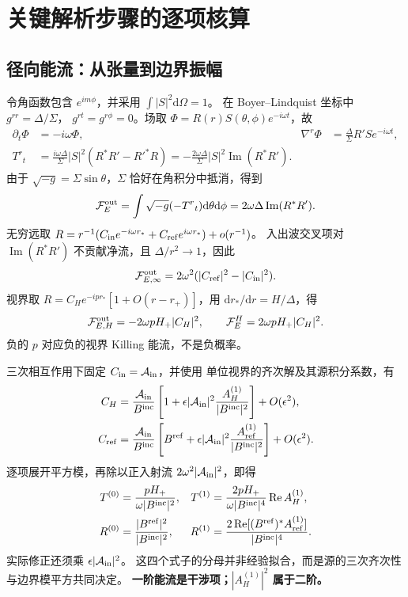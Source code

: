 \documentclass[UTF8,fontset=fandol,11pt,a4paper,oneside]{ctexart}
\numberwithin{equation}{section}
\newcommand{\dd}{\mathrm d}
\newcommand{\Ree}{\operatorname{Re}}
\newcommand{\Imm}{\operatorname{Im}}
\begin{document}
\section{关键解析步骤的逐项核算}
\label{sec:explicit-checks}
\subsection{径向能流：从张量到边界振幅}
令角函数包含 $e^{im\phi}$，并采用 $\int |S|^2\dd\Omega=1$。
在 Boyer--Lindquist 坐标中 $g^{rr}=\Delta/\Sigma$，
$g^{rt}=g^{r\phi}=0$。场取 $\Phi=R(r)S(\theta,\phi)e^{-i\omega t}$，故
\begin{align}
 \partial_t\Phi&=-i\omega\Phi,&
 \nabla^r\Phi&=\frac{\Delta}{\Sigma}R'Se^{-i\omega t},\\
 T^r{}_t
 &=\frac{i\omega\Delta}{\Sigma}|S|^2
       (R^*R'-R'^*R)
 =-\frac{2\omega\Delta}{\Sigma}|S|^2\Imm(R^*R').
\end{align}
由于 $\sqrt{-g}=\Sigma\sin\theta$，$\Sigma$ 恰好在角积分中抵消，得到
\begin{equation}
 \mathcal F_E^{\rm out}=\int\sqrt{-g}(-T^r{}_t)\dd\theta\dd\phi
 =2\omega\Delta\Imm(R^*R').
\end{equation}
无穷远取 $R=r^{-1}(C_{\rm in}e^{-i\omega r_*}
+C_{\rm ref}e^{i\omega r_*})+o(r^{-1})$。
入出波交叉项对 $\Imm(R^*R')$ 不贡献净流，且 $\Delta/r^2\to1$，因此
\begin{equation}
 \mathcal F_{E,\infty}^{\rm out}
 =2\omega^2(|C_{\rm ref}|^2-|C_{\rm in}|^2).
\end{equation}
视界取 $R=C_He^{-ipr_*}[1+O(r-r_+)]$，用 $\dd r_*/\dd r=H/\Delta$，得
\begin{equation}
 \mathcal F_{E,H}^{\rm out}=-2\omega pH_+|C_H|^2,
 \qquad \mathcal F_E^H=2\omega pH_+|C_H|^2.
\end{equation}
负的 $p$ 对应负的视界 Killing 能流，不是负概率。

三次相互作用下固定 $C_{\rm in}=\mathcal A_{\rm in}$，并使用
单位视界的齐次解及其源积分系数，有
\begin{align}
 C_H&=\frac{\mathcal A_{\rm in}}{B^{\rm inc}}
 \left[1+\epsilon|\mathcal A_{\rm in}|^2
       \frac{A_H^{(1)}}{|B^{\rm inc}|^2}\right]+O(\epsilon^2),\\
 C_{\rm ref}&=\frac{\mathcal A_{\rm in}}{B^{\rm inc}}
 \left[B^{\rm ref}+\epsilon|\mathcal A_{\rm in}|^2
       \frac{A_{\rm ref}^{(1)}}{|B^{\rm inc}|^2}\right]+O(\epsilon^2).
\end{align}
逐项展开平方模，再除以正入射流 $2\omega^2|\mathcal A_{\rm in}|^2$，即得
\begin{align}
 T^{(0)}&=\frac{pH_+}{\omega|B^{\rm inc}|^2},&
 T^{(1)}&=\frac{2pH_+}{\omega|B^{\rm inc}|^4}\Ree A_H^{(1)},\\
 R^{(0)}&=\frac{|B^{\rm ref}|^2}{|B^{\rm inc}|^2},&
 R^{(1)}&=\frac{2\Ree[(B^{\rm ref})^*A_{\rm ref}^{(1)}]}
 {|B^{\rm inc}|^4}.
\end{align}
实际修正还须乘 $\epsilon|\mathcal A_{\rm in}|^2$。
这四个式子的分母并非经验拟合，而是源的三次齐次性与边界模平方共同决定。
\textbf{一阶能流是干涉项；$|A_H^{(1)}|^2$ 属于二阶。}
\end{document}
